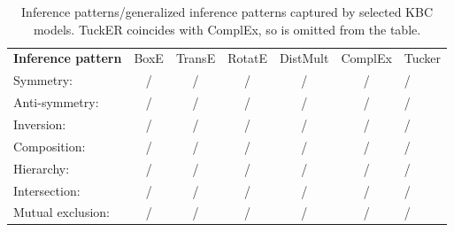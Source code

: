 \documentclass{article}
\begin{document}
\iffalse
\begin{proof}[Proof Sketch]
The theorem is proven by induction, by starting with the all-true KG, which is trivially expressible, and subsequently proving that BoxE with  dimensions can make any fact  false without affecting any of the remaining facts in G. This is done through bumping the entity at position 2 (tail) at dimension  so that it exits the corresponding position box, and then applying a series of parallel changes along the same dimension in entity and relation embeddings, to preserve the state of all other KG facts. Thus, since any fact can be independently made false, any configuration of G is expressible by BoxE with  dimensions, and BoxE is fully expressive. 
\end{proof}
\fi 


\begin{table}[t]
	\centering
	\caption{Inference patterns/generalized inference patterns captured by selected KBC models. TuckER coincides with ComplEx, so is omitted from the table.}
	\begin{tabular}{lc@{\hskip 8pt}c@{\hskip 8pt}c@{\hskip 8pt}c@{\hskip 8pt}cH}
		\toprule
		{\textbf{Inference pattern}} & BoxE & TransE  & RotatE  & DistMult & ComplEx & Tucker\\
		\cmidrule(l){1-7}
		 Symmetry:  &
		 {\cmark/\cmark} &
		 {\xmark/\xmark} &
		 {\cmark/\cmark} &
		 {\cmark/\cmark} &
		 {\cmark/\cmark} &
		 {\cmark/\cmark}  \\
		 Anti-symmetry:  & 
		 {\cmark/\cmark} &  
		 {\cmark/\cmark} &  
		 {\cmark/\cmark} &
		 {\xmark/\xmark} &
		 {\cmark/\cmark} &
		 {\cmark/\cmark}   \\
		 Inversion:   & 
		 {\cmark/\cmark} &  
		 {\cmark/\xmark} &  
		 {\cmark/\cmark} &
		 {\xmark/\xmark} &
		 {\cmark/\cmark} &
		 {\cmark/\cmark}  \\
		 Composition:   &  {\xmark/\xmark} & 
		 {\cmark/\xmark} & 
		 {\cmark/\xmark} &  
		 {\xmark/\xmark} &  
		 {\xmark/\xmark} &  
		 {\xmark/\xmark} \\
		Hierarchy:   & 
		{\cmark/\cmark} &  
		{\xmark/\xmark} &   
		{\xmark/\xmark} &   
		{\cmark/\xmark} &   
		{\cmark/\xmark} &   
		{\cmark/\xmark}  \\
		Intersection:    & {\cmark/\cmark} & 
		{\cmark/\xmark} & 
		{\cmark/\xmark} &  
		{\xmark/\xmark} &  
		{\xmark/\xmark} &  
		{\xmark/\xmark}  \\
		Mutual exclusion:    & 
		{\cmark/\cmark} & 
		{\cmark/\cmark} &  
		{\cmark/\cmark} &  
		{\cmark/\xmark} &  
		{\cmark/\xmark} &  
		{\cmark/\xmark} \\
		\bottomrule
	\end{tabular}
	\label{tab:infPat}
\end{table}
\end{document}
